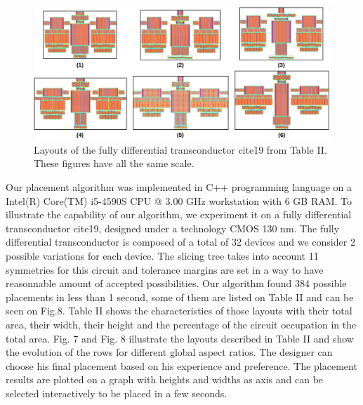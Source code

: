 \begin{figure}[t]
\begin{center}
\includegraphics[width=150mm]{Figures/all.png}
\caption{Layouts of the fully differential transconductor cite{19} from Table II. These figures have all the same scale.}
\end{center}
\end{figure}
Our placement algorithm was implemented in C++ programming language on a Intel(R) Core(TM) i5-4590S CPU @ 3.00 GHz workstation with 6 GB RAM. To illustrate the capability of our algorithm, we experiment it on a fully differential transconductor cite{19}, designed under a technology CMOS 130 nm.
\newline 
\newline 
\indent  The fully differential transconductor is composed of a total of 32 devices and we consider 2 possible variations for each device. The slicing tree takes into account 11 symmetries for this circuit and tolerance margins are set in a way to have reasonnable amount of accepted possibilities. Our algorithm found 384 possible placements in less than 1 second, some of them are listed on Table II and can be seen on Fig.8.
\newline 
\newline 
\indent  Table II shows the characteristics of those layouts with their total area, their width, their height and the percentage of the circuit occupation in the total area. Fig. 7  and Fig. 8 illustrate the layouts described in Table II and show the evolution of the rows for different global aspect ratios. The designer can choose his final placement based on his experience and preference. The placement results are plotted on a graph with heights and widths as axis and can be selected interactively to be placed in a few seconds.

